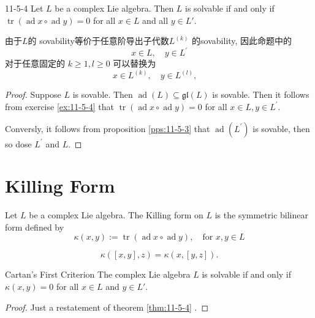 \documentclass[../main.tex]{subfiles}
\begin{document}
\begin{theorem}{}{11-5-4}
Let $L$ be a complex Lie algebra. Then $L$ is solvable if and only if $\operatorname{tr}(\operatorname{ad} x \circ \operatorname{ad} y) = 0$ for all $x \in L$ and all $y \in L'$.
\end{theorem}

\begin{note}
    由于\(  L  \)的 sovability等价于任意阶导出子代数\(  L^{\left( k \right) }  \) 的sovability, 因此命题中的 \[
    x \in L,\quad y \in L^{\prime} 
    \]对于任意固定的 \(  k\ge 1,l\ge 0  \) 可以替换为  \[
    x\in L^{\left( k \right) },\quad y \in L^{\left( l \right) },\quad 
    \]
\end{note}

\begin{proof}
    Suppose \(  L  \) is sovable. Then \(  \operatorname{ad}\left( L \right) \subseteq \mathfrak{gl}\left( L \right)    \) is sovable.  Then it follows from exercise \ref{ex:11-5-4} that  \(  \operatorname{tr}\left( \operatorname{ad}x\circ \operatorname{ad}y \right)= 0   \) for all \(   x \in L, y \in L^{\prime}   \).
    
    Conversly, it follows from proposition \ref{pps:11-5-3} that \(  \operatorname{ad}\left( L^{\prime}  \right)   \) is sovable, then so dose \(  L^{\prime}   \) and   \(  L  \). 
\end{proof}

\section{Killing Form}
\begin{definition}{}{}
    Let $L$ be a complex Lie algebra. The Killing form on $L$ is the symmetric bilinear form defined by
$$\kappa(x, y) := \operatorname{tr}(\operatorname{ad} x \circ \operatorname{ad} y) ,\quad \text{for } x, y \in L$$
\end{definition}
\begin{proposition}{}{}
    \[
\kappa([x, y], z) = \kappa(x, [y, z]).
\]

\end{proposition}
\begin{theorem}{Cartan's First Criterion}{}
The complex Lie algebra $L$ is solvable if and only if $\kappa(x,y) = 0$ for all $x \in L$ and $y \in L'$.
\end{theorem}

\begin{proof}
    Just a restatement of theorem \ref{thm:11-5-4}    . 
\end{proof}
\end{document}
